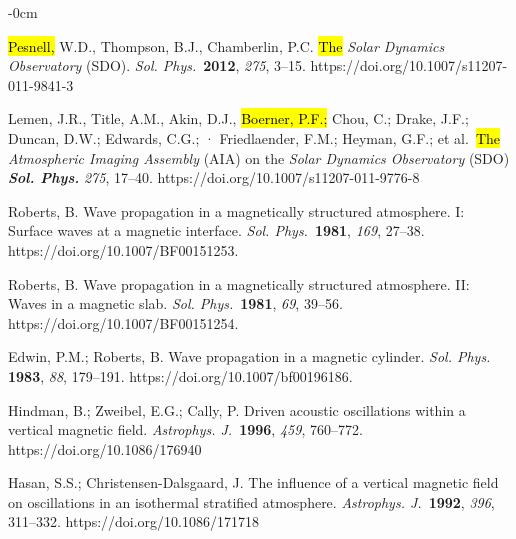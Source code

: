 \documentclass[physics,article,accept,pdftex,moreauthors]{Definitions/mdpi}
\newcommand{\apj}{{\it Astrophys. J.}}
\newcommand{\solphys}{{\it Sol. Phys.}}
\begin{document}
\begin{adjustwidth}{-\extralength}{0cm}
\begin{thebibliography}{999}
 \hl{Pesnell,} %
W.D., Thompson, B.J., Chamberlin, P.C. 
\hl{The} \emph{Solar Dynamics Observatory} (SDO). \solphys\ {\bf 2012}, {\it 275}, 3--15. 
 https://doi.org/10.1007/s11207-011-9841-3	

 Lemen, J.R., Title, A.M., Akin, D.J.,  
\hl{Boerner, P.F.;} %
Chou, C.; 
Drake, J.F.;  
Duncan, D.W.;  
Edwards, C.G.;  ·
Friedlaender, F.M.;  
Heyman, G.F.; 
 et al.\ 
\hl{The} \emph{Atmospheric Imaging Assembly} (AIA) on the \emph{Solar
Dynamics Observatory} (SDO)
{\bf \solphys} {\it 275}, 17--40. 
https://doi.org/10.1007/s11207-011-9776-8


		
		
		 Roberts, B. {Wave propagation in a magnetically structured atmosphere. 
 {I:} %
 Surface waves at a magnetic interface}. \solphys~\textbf{1981}, \emph{169}, 
27{--38.} https://doi.org/10.1007/BF00151253.
		
		 Roberts, B. {Wave propagation in a magnetically structured atmosphere. 
 {II:} 
 Waves in a magnetic slab}. \solphys~\textbf{1981}, \emph{69}, 39{--56.} https://doi.org/10.1007/BF00151254.
		
		
		 Edwin, P.M.; Roberts, B. Wave propagation in a magnetic cylinder. \emph{Sol. Phys.} \textbf{1983}, \emph{88}, 179--191. https://doi.org/10.1007/bf00196186.
		
		
		Hindman, B.; Zweibel, E.G.; Cally, P. Driven acoustic oscillations within a vertical magnetic field. \apj~\textbf{1996}, \emph{459}, 
760{--772.} {https://doi.org/10.1086/176940} 
		
		 Hasan, S.S.; Christensen-Dalsgaard, J. The influence of a 
vertical magnetic field on oscillations in an isothermal stratified atmosphere. \apj~\textbf{1992}, \emph{396}, 311{--332.} 
 {https://doi.org/10.1086/171718} 


\end{thebibliography}
\end{adjustwidth}
\end{document}
